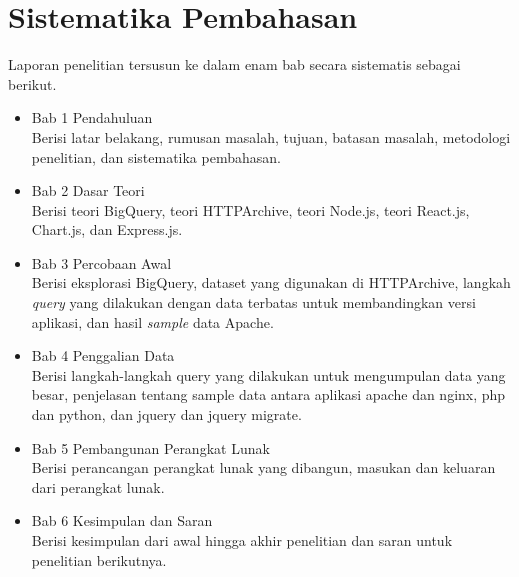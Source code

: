 \section{Sistematika Pembahasan}
\label{sec:sispem}
Laporan penelitian tersusun ke dalam enam bab secara sistematis sebagai berikut.
\begin{itemize}
    \item Bab 1 Pendahuluan\\
    Berisi latar belakang, rumusan masalah, tujuan, batasan masalah, metodologi penelitian, dan sistematika pembahasan.
   
   \item Bab 2 Dasar Teori\\
    Berisi teori BigQuery, teori HTTPArchive, teori Node.js, teori React.js, Chart.js, dan Express.js.
   
    \item Bab 3 Percobaan Awal\\
    Berisi eksplorasi BigQuery, dataset yang digunakan di HTTPArchive, langkah \textit{query} yang dilakukan dengan data terbatas untuk membandingkan versi aplikasi, dan hasil \textit{sample} data Apache.
  
    \item Bab 4 Penggalian Data\\
    Berisi langkah-langkah query yang dilakukan untuk mengumpulan data yang besar, penjelasan tentang sample data antara aplikasi apache dan nginx, php dan python, dan jquery dan jquery migrate.
    
    \item Bab 5 Pembangunan Perangkat Lunak\\
Berisi perancangan perangkat lunak yang dibangun, masukan dan keluaran dari perangkat lunak.
   
    \item Bab 6 Kesimpulan dan Saran\\
    Berisi kesimpulan dari awal hingga akhir penelitian dan saran untuk penelitian berikutnya.
    \end{itemize}
